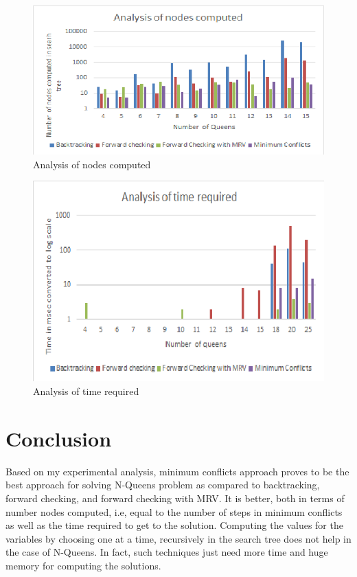 \documentclass[conference]{IEEEtran}
\begin{document}
\begin{figure}
\includegraphics[scale=0.51]{XLS_nodesComputed.png}
\caption{Analysis of nodes computed}
\label{Figure10}
\end{figure}


\begin{figure}
\includegraphics[scale=0.61]{XLS_time.png}
\caption{Analysis of time required}
\label{Figure11}
\end{figure}


\section{Conclusion}
Based on my experimental analysis, minimum conflicts approach proves to be the best approach for solving N-Queens problem as compared to backtracking, forward checking, and forward checking with MRV. It is better, both in terms of number nodes computed, i.e, equal to the number of steps in minimum conflicts as well as the time required to get to the solution. Computing the values for the variables by choosing one at a time, recursively in the search tree does not help in the case of N-Queens. In fact, such techniques just need more time and huge memory for computing the solutions.
\end{document}

